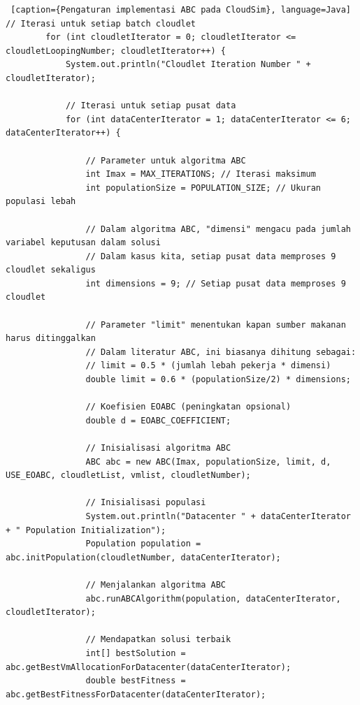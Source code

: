 \begin{lstlisting} [caption={Pengaturan implementasi ABC pada CloudSim}, language=Java]
// Iterasi untuk setiap batch cloudlet
        for (int cloudletIterator = 0; cloudletIterator <= cloudletLoopingNumber; cloudletIterator++) {
            System.out.println("Cloudlet Iteration Number " + cloudletIterator);

            // Iterasi untuk setiap pusat data
            for (int dataCenterIterator = 1; dataCenterIterator <= 6; dataCenterIterator++) {
                
                // Parameter untuk algoritma ABC
                int Imax = MAX_ITERATIONS; // Iterasi maksimum
                int populationSize = POPULATION_SIZE; // Ukuran populasi lebah
                
                // Dalam algoritma ABC, "dimensi" mengacu pada jumlah variabel keputusan dalam solusi
                // Dalam kasus kita, setiap pusat data memproses 9 cloudlet sekaligus
                int dimensions = 9; // Setiap pusat data memproses 9 cloudlet
                
                // Parameter "limit" menentukan kapan sumber makanan harus ditinggalkan
                // Dalam literatur ABC, ini biasanya dihitung sebagai:
                // limit = 0.5 * (jumlah lebah pekerja * dimensi)
                double limit = 0.6 * (populationSize/2) * dimensions;
                
                // Koefisien EOABC (peningkatan opsional)
                double d = EOABC_COEFFICIENT;
            
                // Inisialisasi algoritma ABC
                ABC abc = new ABC(Imax, populationSize, limit, d, USE_EOABC, cloudletList, vmlist, cloudletNumber);

                // Inisialisasi populasi
                System.out.println("Datacenter " + dataCenterIterator + " Population Initialization");
                Population population = abc.initPopulation(cloudletNumber, dataCenterIterator);

                // Menjalankan algoritma ABC
                abc.runABCAlgorithm(population, dataCenterIterator, cloudletIterator);

                // Mendapatkan solusi terbaik
                int[] bestSolution = abc.getBestVmAllocationForDatacenter(dataCenterIterator);
                double bestFitness = abc.getBestFitnessForDatacenter(dataCenterIterator);
                

\end{lstlisting}

